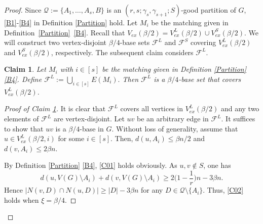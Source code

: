 \documentclass[11pt, a4paper]{article}
\newtheorem{claim}[theorem]{Claim}
\theoremstyle{definition}
\newcommand{\<}{\subseteq}
\begin{document}
\begin{proof}
Since $\mathcal{Q}:=\{A_1,\ldots,A_s,B\}$ is an $(r,s;\gamma_s,\gamma_{s+1};S)$-good partition of $G$, \ref{B1}-\ref{B4} in Definition \ref{Partition}  hold.  Let $M_i$ be the matching given in Definition~\ref{Partition}~\ref{B4}. Recall that $V_{ex}(\beta/2)=V_{ex}^L(\beta/2) \cup V_{ex}^S(\beta/2)$. We will construct two  vertex-disjoint $\beta/4$-base sets $\mathcal{F}^L$ and $\mathcal{F}^S$ covering $V_{ex}^L(\beta/2)$ and $V_{ex}^S(\beta/2)$, respectively. The subsequent  claim considers $\mathcal{F}^L$. %

\begin{claim}\label{claim-matching}
Let $M_i$ with $i\in [s]$ be the matching given in Definition \ref{Partition} \ref{B4}. Define $
\mathcal{F}^L:=\bigcup_{i\in [s]}E(M_i).
$ 
Then $\mathcal{F}^L$ is a $\beta/4$-base set that covers $V_{ex}^L(\beta/2)$. %
\end{claim}
\begin{proof}[Proof of Claim \ref{claim-matching}]
It is clear that $\mathcal{F}^L$ covers all vertices in $V_{ex}^L(\beta/2)$ and any two elements of $\mathcal{F}^L$ are vertex-disjoint. Let $uv$ be an arbitrary edge in $\mathcal{F}^L$. %
It suffices to show that $uv$ is a ${\beta}/{4}$-base in $G$. Without loss of generality, assume that $u\in V_{ex}^L(\beta/2,i)$ for some $i\in [s]$. Then, $d(u,A_i)\le \beta n/2$ and $d(v,A_i)\le 2\beta n.$

By Definition \ref{Partition} \ref{B4}, \ref{C01} holds obviously. As $u,v\notin S$, one has  
$$d(u, V(G)\setminus A_i)+d(v,V(G)\setminus A_i)\ge2\Big(1-\frac{1}{r}\Big)n-3\beta n.$$
Hence $|N(v,D)\cap N(u,D)|\ge |D|-3\beta n$ for any $D\in \mathcal{Q}\setminus\{A_i\}.$ Thus, \ref{C02} holds when  $\xi=\beta /4$.
\end{proof}


\end{proof}
\end{document}
